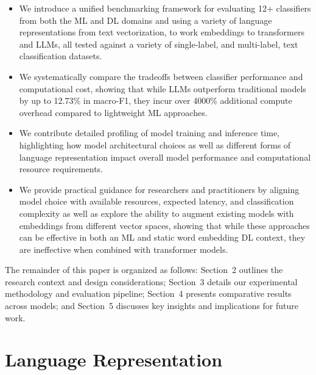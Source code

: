 \documentclass[final]{clv2025}
\begin{document}
\begin{itemize}
    \item We introduce a unified benchmarking framework for evaluating 12+ classifiers from both the ML and DL domains and using a variety of language representations from text vectorization, to work embeddings to transformers and LLMs, all tested against a variety of single-label, and multi-label, text classification datasets.
    \item We systematically compare the tradeoffs between classifier performance and computational cost, showing that while LLMs outperform traditional models by up to 12.73\% in macro-F1, they incur over 4000\% additional compute overhead compared to lightweight ML approaches.
    \item We contribute detailed profiling of model training and inference time, highlighting how model architectural choices as well as different forms of language representation impact overall model performance and computational resource requirements.
    \item We provide practical guidance for researchers and practitioners by aligning model choice with available resources, expected latency, and classification complexity as well as explore the ability to augment existing models with embeddings from different vector spaces, showing that while these approaches can be effective in both an ML and static word embedding DL context, they are ineffective when combined with transformer models.
\end{itemize}

The remainder of this paper is organized as follows: Section~2 outlines the research context and design considerations; Section~3 details our experimental methodology and evaluation pipeline; Section~4 presents comparative results across models; and Section~5 discusses key insights and implications for future work.


\section{Language Representation}
\end{document}
